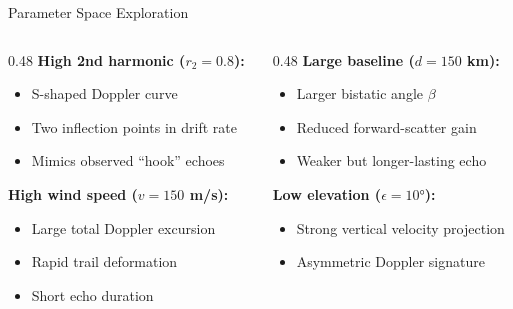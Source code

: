 \documentclass[aspectratio=169,11pt]{beamer}
\begin{document}
\begin{frame}{Parameter Space Exploration}
\begin{columns}
\begin{column}{0.48\textwidth}
\textbf{High 2nd harmonic ($r_2 = 0.8$):}
\begin{itemize}
    \item S-shaped Doppler curve
    \item Two inflection points in drift rate
    \item Mimics observed ``hook'' echoes
\end{itemize}
\vspace{0.5em}
\textbf{High wind speed ($v = 150$ m/s):}
\begin{itemize}
    \item Large total Doppler excursion
    \item Rapid trail deformation
    \item Short echo duration
\end{itemize}
\end{column}
\begin{column}{0.48\textwidth}
\textbf{Large baseline ($d = 150$ km):}
\begin{itemize}
    \item Larger bistatic angle $\beta$
    \item Reduced forward-scatter gain
    \item Weaker but longer-lasting echo
\end{itemize}
\vspace{0.5em}
\textbf{Low elevation ($\epsilon = 10°$):}
\begin{itemize}
    \item Strong vertical velocity projection
    \item Asymmetric Doppler signature
\end{itemize}
\end{column}
\end{columns}
\end{frame}

\end{document}
